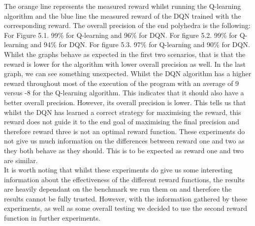 The orange line represents the measured reward whilst running the Q-learning algorithm and the blue line the measured reward of the DQN trained with the corresponding reward. The overall precision of the end polyhedra is the following: For Figure 5.1. 99\% for Q-learning and 96\% for DQN. For figure 5.2. 99\% for Q-learning and 94\% for DQN. For figure 5.3. 97\% for Q-learning and 90\% for DQN. Whilst the graphs behave as expected in the first two scenarios, that is that the reward is lower for the algorithm with lower overall precision as well. In the last graph, we can see something unexpected. Whilst the DQN algorithm has a higher reward throughout most of the execution of the program with an average of 9 versus -8 for the Q-learning algorithm. This indicates that it should also have a better overall precision. However, its overall precision is lower. This tells us that whilst the DQN has learned a correct strategy for maximising the reward, this reward does not guide it to the end goal of maximising the final precision and therefore reward three is not an optimal reward function. These experiments do not give us much information on the differences between reward one and two as they both behave as they should. This is to be expected as reward one and two are similar.\\
It is worth noting that whilst these experiments do give us some interesting information about the effectiveness of the different reward functions, the results are heavily dependant on the benchmark we run them on and therefore the results cannot be fully trusted. However, with the information gathered by these experiments, as well as some overall testing we decided to use the second reward function in further experiments.


